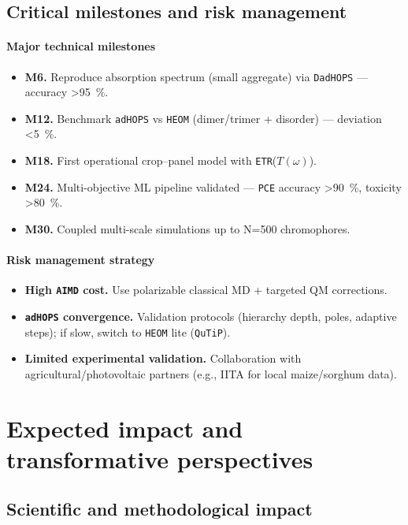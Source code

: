 \documentclass[12pt, a4paper]{article}
\begin{document}
\subsection{Critical milestones and risk management}

\paragraph{Major technical milestones}
\begin{itemize}
    \item \textbf{M6.} Reproduce absorption spectrum (small aggregate) via \texttt{DadHOPS} — accuracy \SI{>95}{\percent}.
    \item \textbf{M12.} Benchmark \texttt{adHOPS} vs \texttt{HEOM} (dimer/trimer + disorder) — deviation \SI{<5}{\percent}.
    \item \textbf{M18.} First operational crop–panel model with \texttt{ETR}($T(\omega)$).
    \item \textbf{M24.} Multi-objective ML pipeline validated — \texttt{PCE} accuracy \SI{>90}{\percent}, toxicity \SI{>80}{\percent}.
    \item \textbf{M30.} Coupled multi-scale simulations up to N=\num{500} chromophores.
\end{itemize}

\paragraph{Risk management strategy}
\begin{itemize}
    \item \textbf{High \texttt{AIMD} cost.} Use polarizable classical MD + targeted QM corrections.
    \item \textbf{\texttt{adHOPS} convergence.} Validation protocols (hierarchy depth, poles, adaptive steps); if slow, switch to \texttt{HEOM} lite (\texttt{QuTiP}).
    \item \textbf{Limited experimental validation.} Collaboration with agricultural/photovoltaic partners (e.g., IITA for local maize/sorghum data).
\end{itemize}


\section{Expected impact and transformative perspectives}

\subsection{Scientific and methodological impact}
\end{document}
